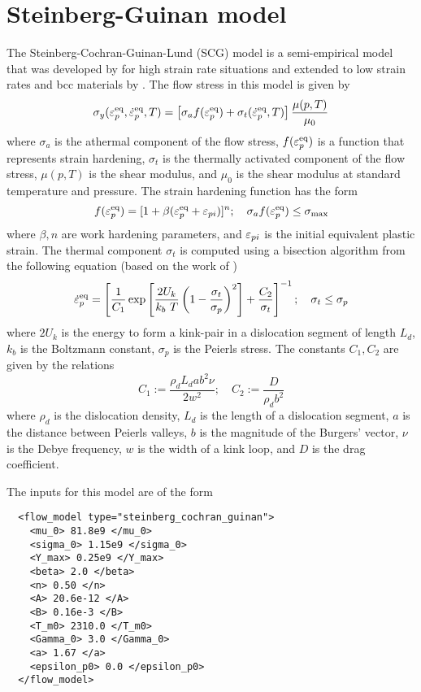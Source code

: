 \section{Steinberg-Guinan model}
The Steinberg-Cochran-Guinan-Lund (SCG) model is a semi-empirical model
that was developed by \cite{Steinberg1980} for high strain rate 
situations and extended to low strain rates and bcc materials by
\cite{Steinberg1989}.  The flow stress in this model is given by
\begin{equation}\label{eq:SCGL}
  \sigma_y(\varepsilon_p^\text{eq},\dot{\varepsilon}_{p}^\text{eq},T) = 
   \left[\sigma_a f(\varepsilon_p^\text{eq}) + \sigma_t (\dot{\varepsilon}_{p}^\text{eq}, T)\right]
   \frac{\mu(p,T)}{\mu_0} 
\end{equation}
where $\sigma_a$ is the athermal component of the flow stress,
$f(\varepsilon_p^\text{eq})$ is a function that represents strain hardening,
$\sigma_t$ is the thermally activated component of the flow stress,
$\mu(p,T)$ is the shear modulus, and $\mu_0$ is the shear modulus 
at standard temperature and pressure.  The strain hardening function
has the form
\begin{equation}
  f(\varepsilon_p^\text{eq}) = [1 + \beta(\varepsilon_p^\text{eq} + \varepsilon_{pi})]^n ; \quad
  \sigma_a f(\varepsilon_p^\text{eq}) \le \sigma_{\text{max}}
\end{equation}
where $\beta, n$ are work hardening parameters, and $\varepsilon_{pi}$ is the 
initial equivalent plastic strain.  The thermal component $\sigma_t$
is computed using a bisection algorithm from the following equation (based 
on the work of \cite{Hoge1977})
\begin{equation}
  \dot{\varepsilon}_{p}^\text{eq} = \left[\frac{1}{C_1}\exp\left[\frac{2U_k}{k_b~T}
    \left(1 - \frac{\sigma_t}{\sigma_p}\right)^2\right] + 
    \frac{C_2}{\sigma_t}\right]^{-1}; \quad
  \sigma_t \le \sigma_p
\end{equation}
where $2 U_k$ is the energy to form a kink-pair in a dislocation segment
of length $L_d$, $k_b$ is the Boltzmann constant, $\sigma_p$ is the Peierls
stress. The constants $C_1, C_2$ are given by the relations
\begin{equation}
  C_1 := \frac{\rho_d L_d a b^2 \nu}{2 w^2}; \quad
  C_2 := \frac{D}{\rho_d b^2}
\end{equation}
where $\rho_d$ is the dislocation density, $L_d$ is the length of a 
dislocation segment, $a$ is the distance between Peierls valleys, 
$b$ is the magnitude of the Burgers' vector, $\nu$ is the Debye frequency,
$w$ is the width of a kink loop, and $D$ is the drag coefficient.

The inputs for this model are of the form
\lstset{language=XML}
\begin{lstlisting}
  <flow_model type="steinberg_cochran_guinan">
    <mu_0> 81.8e9 </mu_0>
    <sigma_0> 1.15e9 </sigma_0>
    <Y_max> 0.25e9 </Y_max>
    <beta> 2.0 </beta>
    <n> 0.50 </n>
    <A> 20.6e-12 </A>
    <B> 0.16e-3 </B>
    <T_m0> 2310.0 </T_m0>
    <Gamma_0> 3.0 </Gamma_0>
    <a> 1.67 </a>
    <epsilon_p0> 0.0 </epsilon_p0>
  </flow_model>
\end{lstlisting}

